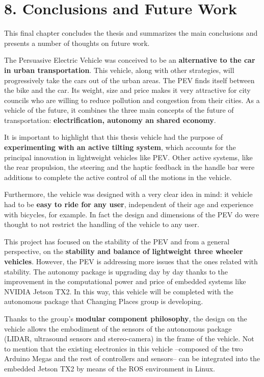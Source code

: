 \chapter{8. Conclusions and Future Work}

This final chapter concludes the thesis and summarizes the main conclusions and presents a number of thoughts on future work.

The Persuasive Electric Vehicle was conceived to be an \textbf{alternative to the car in urban transportation}. This vehicle, along with other strategies, will progressively take the cars out of the urban areas. The PEV finds itself between the bike and the car. Its weight, size and price makes it very attractive for city councils who are willing to reduce pollution and congestion from their cities. As a vehicle of the future, it combines the three main concepts of the future of transportation: \textbf{electrification, autonomy an shared economy}.

It is important to highlight that this thesis vehicle had the purpose of \textbf{experimenting with an active tilting system}, which accounts for the principal innovation in lightweight vehicles like PEV. Other active systems, like the rear propulsion, the steering and the haptic feedback in the handle bar were additions to complete the active control of all the motions in the vehicle. 

Furthermore, the vehicle was designed with a very clear idea in mind: it vehicle had to be \textbf{easy to ride for any user}, independent of their age and experience with bicycles, for example. In fact the design and dimensions of the PEV do were thought to not restrict the handling of the vehicle to any user.

This project has focused on the stability of the PEV and from a general perspective, on the \textbf{stability and balance of lightweight three wheeler vehicles}. However, the PEV is addressing more issues that the ones related with stability. The autonomy package is upgrading day by day thanks to the improvement in the computational power and price of embedded systems like NVIDIA Jetson TX2. In this way, this vehicle will be completed with the autonomous package that Changing Places group is developing.

\newpage
Thanks to the group's \textbf{modular component philosophy}, the design on the vehicle allows the embodiment of the sensors of the autonomous package (LIDAR, ultrasound sensors and stereo-camera) in the frame of the vehicle. Not to mention that the existing electronics in this vehicle --composed of the two Arduino Megas and the rest of controllers and sensors-- can be integrated into the embedded Jetson TX2 by means of the ROS environment in Linux.

